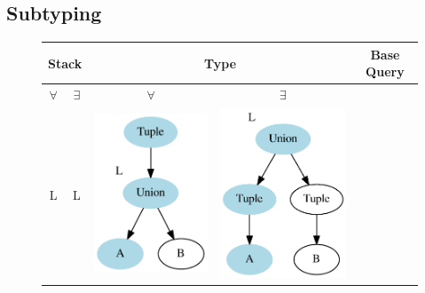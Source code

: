 \documentclass[a4paper,english]{lipics-v2019}
\newcommand{\goodcell}{\cellcolor{green!25}}
\begin{document}
\subsection{Subtyping}

\begin{figure}[h]
\center
\begin{tabular}{cc|cc|c}
\multicolumn{2}{c}{Stack} & \multicolumn{2}{c}{Type} & Base Query \\
\hline
$\forall$ & $\exists$ & $\forall$ & $\exists$ & \\
\hline
\goodcell L & \goodcell L & \goodcell \includegraphics[scale=0.3]{figures-gen/left1.pdf} & \goodcell \includegraphics[scale=0.3]{figures-gen/right1.pdf} 

\end{tabular}
\end{figure}
\end{document}
